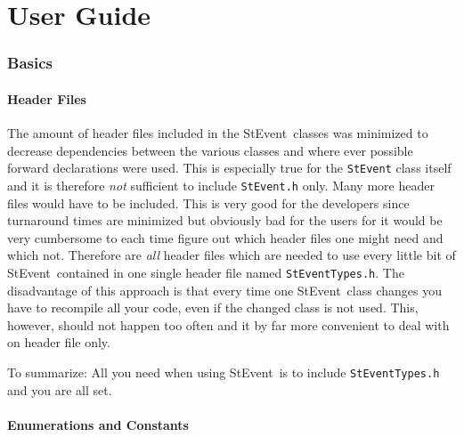 \documentclass[twoside]{article}
\newcommand{\StEvent}{\textsf{StEvent}}
\begin{document}
\clearpage

%
%
\part{User Guide}
\clearpage

\section{Basics} %
\label{sec:Basics}

\subsection{Header Files}
\label{sec:HeaderFiles}
 

The amount of header files included in the \StEvent\ classes was
minimized to decrease dependencies between the various classes and
where ever possible forward declarations were used.  This is
especially true for the \texttt{StEvent} class itself and it is
therefore \emph{not} sufficient to include \texttt{StEvent.h} only.
Many more header files would have to be included. This is very good
for the developers since turnaround times are minimized but obviously
bad for the users for it would be very cumbersome to each time figure
out which header files one might need and which not. Therefore are
\emph{all} header files which are needed to use every little bit of
\StEvent\ contained in one single header file named
\texttt{StEventTypes.h}.  The disadvantage of this approach is that
every time one \StEvent\ class changes you have to recompile all your
code, even if the changed class is not used. This, however, should not
happen too often and it by far more convenient to deal with on header
file only.

To summarize: All you need when using \StEvent\ is to include
\texttt{StEventTypes.h} and you are all set.

\subsection{Enumerations and Constants}
\label{sec:Enumerations}
  
 
\end{document}
